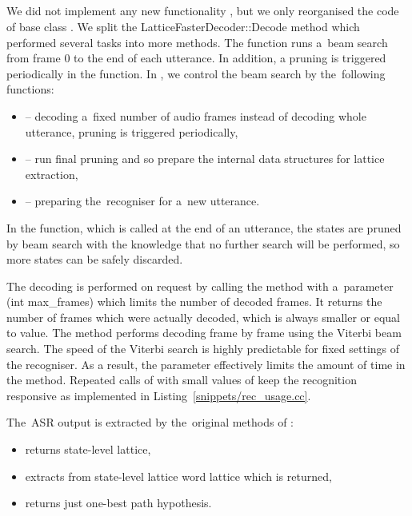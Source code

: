 \subsection{}
\label{sub:dec}
We did not implement any new functionality , but we only reorganised the code of base class .
We split the LatticeFasterDecoder::Decode method which performed several tasks into more methods.
The  function runs a~beam search from frame 0 to the end of each utterance.
In addition, a pruning is triggered periodically in the function.
In ,  we control the beam search by the~following functions: 
\begin{itemize}
    \item {} -- decoding a~fixed number of audio frames instead of decoding whole utterance, pruning is triggered periodically,
    \item {} -- run final pruning and so prepare the internal data structures for lattice extraction,
    \item {} -- preparing the~recogniser for a~new utterance.
\end{itemize}

In the  function, which is called at the end of an utterance, the states are pruned by beam search with the knowledge that no further search will be performed, so more states can be safely discarded.

The decoding is performed on request by calling the  method with a~parameter (int max\_frames) which limits the number of decoded frames.
It returns the number of frames which were actually decoded, which is always smaller or equal to  value.
The  method performs decoding frame by frame using the Viterbi beam search.
The speed of the Viterbi search is highly predictable for fixed settings of the recogniser. 
As a result, the  parameter effectively limits the amount of time in the  method.
Repeated calls of  with small values of  keep the recognition responsive as implemented in Listing~\ref{snippets/rec_usage.cc}. 

The~\ac{ASR} output is extracted by the~original methods of :
\begin{itemize}
    \item {} returns state-level lattice,
    \item {} extracts from state-level lattice word lattice which is returned,
    \item {} returns just one-best path hypothesis.
\end{itemize}

